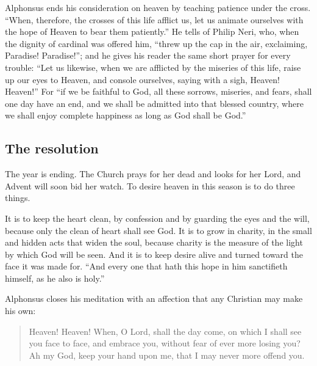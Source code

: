 Alphonsus ends his consideration on heaven by teaching patience under the cross. ``When, therefore, the crosses of this life afflict us, let us animate ourselves with the hope of Heaven to bear them patiently.'' He tells of Philip Neri, who, when the dignity of cardinal was offered him, ``threw up the cap in the air, exclaiming, Paradise! Paradise!''; and he gives his reader the same short prayer for every trouble: ``Let us likewise, when we are afflicted by the miseries of this life, raise up our eyes to Heaven, and console ourselves, saying with a sigh, Heaven! Heaven!'' For ``if we be faithful to God, all these sorrows, miseries, and fears, shall one day have an end, and we shall be admitted into that blessed country, where we shall enjoy complete happiness as long as God shall be God.''

\subsection{The resolution}

The year is ending. The Church prays for her dead and looks for her Lord, and Advent will soon bid her watch. To desire heaven in this season is to do three things.

It is to keep the heart clean, by confession and by guarding the eyes and the will, because only the clean of heart shall see God. It is to grow in charity, in the small and hidden acts that widen the soul, because charity is the measure of the light by which God will be seen. And it is to keep desire alive and turned toward the face it was made for. ``And every one that hath this hope in him sanctifieth himself, as he also is holy.''

Alphonsus closes his meditation with an affection that any Christian may make his own:

\begin{quote}
Heaven! Heaven! When, O Lord, shall the day come, on which I shall see you face to face, and embrace you, without fear of ever more losing you? Ah my God, keep your hand upon me, that I may never more offend you.
\end{quote}
